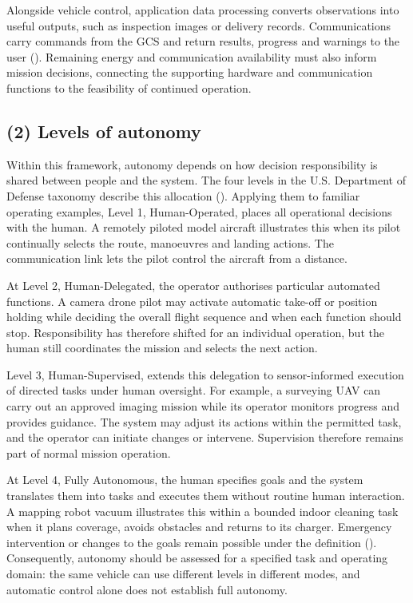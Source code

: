 Alongside vehicle control, application data processing converts observations into useful outputs, such as inspection images or delivery records. Communications carry commands from the GCS and return results, progress and warnings to the user (\citealp[p. 21, Fig. 2]{Chen2022}). Remaining energy and communication availability must also inform mission decisions, connecting the supporting hardware and communication functions to the feasibility of continued operation.



\subsection*{(2) Levels of autonomy}
Within this framework, autonomy depends on how decision responsibility is shared between people and the system. The four levels in the U.S. Department of Defense taxonomy describe this allocation (\citealp[p. 46, Table 3]{DoD2011}). Applying them to familiar operating examples, Level 1, Human-Operated, places all operational decisions with the human. A remotely piloted model aircraft illustrates this when its pilot continually selects the route, manoeuvres and landing actions. The communication link lets the pilot control the aircraft from a distance.

At Level 2, Human-Delegated, the operator authorises particular automated functions. A camera drone pilot may activate automatic take-off or position holding while deciding the overall flight sequence and when each function should stop. Responsibility has therefore shifted for an individual operation, but the human still coordinates the mission and selects the next action.

Level 3, Human-Supervised, extends this delegation to sensor-informed execution of directed tasks under human oversight. For example, a surveying UAV can carry out an approved imaging mission while its operator monitors progress and provides guidance. The system may adjust its actions within the permitted task, and the operator can initiate changes or intervene. Supervision therefore remains part of normal mission operation.

At Level 4, Fully Autonomous, the human specifies goals and the system translates them into tasks and executes them without routine human interaction. A mapping robot vacuum illustrates this within a bounded indoor cleaning task when it plans coverage, avoids obstacles and returns to its charger. Emergency intervention or changes to the goals remain possible under the definition (\citealp[p. 46]{DoD2011}). Consequently, autonomy should be assessed for a specified task and operating domain: the same vehicle can use different levels in different modes, and automatic control alone does not establish full autonomy.


